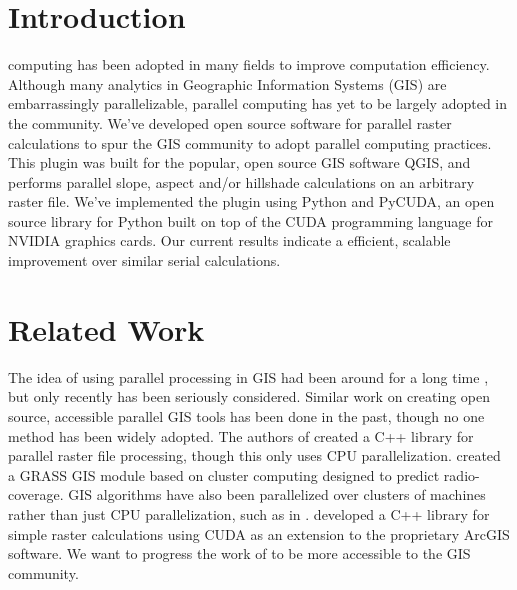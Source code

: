 \documentclass[journal]{IEEEtran}
\begin{document}
\section{Introduction}
% 
% 
% 
% 
 computing has been adopted in many fields to improve
computation efficiency. Although many analytics in Geographic Information
Systems (GIS) are embarrassingly parallelizable, parallel computing has yet to
be largely adopted in the community. We've developed open source software for
parallel raster calculations to spur the GIS community to adopt parallel
computing practices. This plugin was built for the popular, open source GIS
software QGIS, and performs parallel slope, aspect and/or hillshade
calculations on an arbitrary raster file.  We've implemented the plugin using
Python and PyCUDA, an open source library for Python built on top of the CUDA
programming language for \textsc{NVIDIA} graphics cards. Our current results
indicate a efficient, scalable improvement over similar serial calculations.

\section{Related Work} \label{related}
The idea of using parallel processing in GIS had been around for a long time
\cite{healy}, but only recently has been seriously considered.  Similar work on
creating open source, accessible parallel GIS tools has been done in the past,
though no one method has been widely adopted. The authors of \cite{guan}
created a C++ library for parallel raster file processing, though this only
uses CPU parallelization. \cite{benedicic} created a GRASS GIS module based on
cluster computing designed to predict radio-coverage.  GIS algorithms have also
been parallelized over clusters of machines rather than just CPU
parallelization, such as in \cite{huang}.  \cite{hpc_cuda} developed a C++
library for simple raster calculations using CUDA as an extension to the
proprietary ArcGIS software. We want to progress the work of \cite{hpc_cuda} to
be more accessible to the GIS community.
\end{document}
